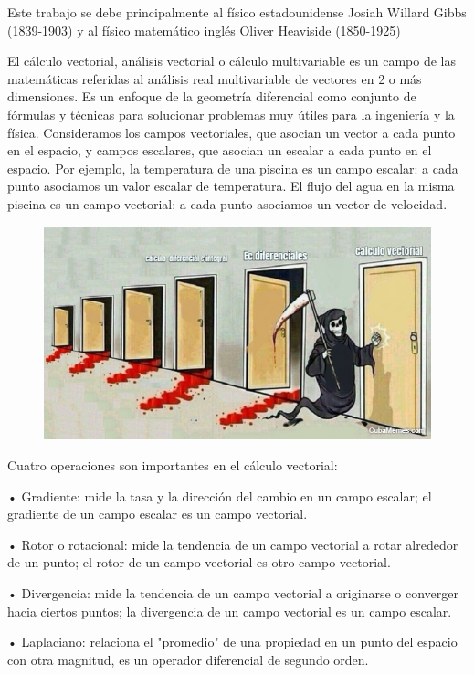 \textcolor{gris}{ Este trabajo se debe principalmente al físico estadounidense Josiah Willard Gibbs (1839-1903) y al físico matemático inglés Oliver Heaviside (1850-1925)}

\begin{multicols}{2}
\textcolor{gris}{ El cálculo vectorial, análisis vectorial o cálculo multivariable es un campo de las matemáticas referidas al análisis real multivariable de vectores en 2 o más dimensiones. Es un enfoque de la geometría diferencial como conjunto de fórmulas y técnicas para solucionar problemas muy útiles para la ingeniería y la física. Consideramos los campos vectoriales, que asocian un vector a cada punto en el espacio, y campos escalares, que asocian un escalar a cada punto en el espacio. Por ejemplo, la temperatura de una piscina es un campo escalar: a cada punto asociamos un valor escalar de temperatura. El flujo del agua en la misma piscina es un campo vectorial: a cada punto asociamos un vector de velocidad.} 
\begin{figure}[H]
	\centering
	\includegraphics[width=.5\textwidth]{imagenes/imagenescv/xisteCalcVect.png}
\end{figure}
\end{multicols}

\textcolor{gris}{ Cuatro operaciones son importantes en el cálculo vectorial: }

\textcolor{gris}{ •	Gradiente: mide la tasa y la dirección del cambio en un campo escalar; el gradiente de un campo escalar es un campo vectorial.}

\textcolor{gris}{ •	Rotor o rotacional: mide la tendencia de un campo vectorial a rotar alrededor de un punto; el rotor de un campo vectorial es otro campo vectorial.}

\textcolor{gris}{ •	Divergencia: mide la tendencia de un campo vectorial a originarse o converger hacia ciertos puntos; la divergencia de un campo vectorial es un campo escalar.}

\textcolor{gris}{ •	Laplaciano: relaciona el "promedio" de una propiedad en un punto del espacio con otra magnitud, es un operador diferencial de segundo orden.}

